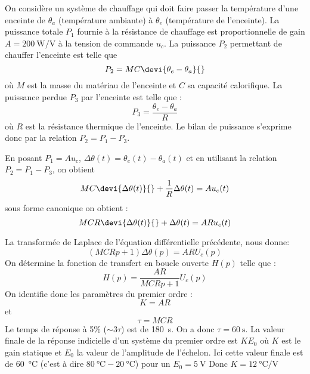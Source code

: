 On considère un système de chauffage qui doit faire passer la température 
d'une enceinte de $\theta_a$  (température ambiante) à $\theta_e$ (température 
de l'enceinte). 
La puissance totale $P_1$ fournie à la résistance de chauffage 
est proportionnelle de gain $A=\SI{200}{\watt\per\volt}$ à la tension de 
commande $u_c$. La puissance $P_2$ permettant de chauffer l'enceinte est 
telle que 
\[
    P_2=MC\devi{\theta_e-\theta_a}{}
\]
où $M$ est la masse du matériau de l'enceinte et $C$ sa capacité calorifique.
La puissance perdue $P_3$ par l'enceinte est telle que :
\[
    P_3=\dfrac{\theta_e-\theta_a}{R}
\]
où $R$ est la résistance thermique de l'enceinte.
Le bilan de puissance s'exprime donc par la relation $P_2=P_1-P_3$.

En posant $P_1=Au_c$, $\Delta\theta(t)=\theta_e(t)-\theta_a(t)$ et en utilisant
la relation $P_2=P_1-P_3$, on obtient 
\[
    MC\devi{\Delta\theta(t)}{}+\dfrac{1}{R}\Delta\theta(t)=Au_c(t)
\]
sous forme canonique on obtient :
\[
    MCR\devi{\Delta\theta(t)}{}+\Delta\theta(t)=ARu_c(t)
\]

La transformée de Laplace de l'équation différentielle précédente, nous donne:
\[
    (MCRp+1)\Delta\theta(p)=AR U_c(p)
\]
On détermine la fonction de transfert en boucle ouverte $H(p)$ telle que :
\[
    H(p)=\dfrac{AR}{MCRp+1} U_c(p)
\]
On identifie donc les paramètres du premier ordre :
\[
    K=AR
\]
et
\[
    \tau=MCR
\]
Le temps de réponse à 5\% ($\sim 3\tau$) est de \SI{180}{\second}. 
On a donc $\tau=\SI{60}{\second}$. 
La valeur finale de la réponse indicielle d'un système du premier ordre est 
$KE_0$ où $K$ est le gain statique et $E_0$ la valeur de l'amplitude de 
l'échelon. Ici cette valeur finale est de \SI{60}{\celsius} (c'est à dire 
$\SI{80}{\celsius} -\SI{20}{\celsius}$) pour un $E_0=\SI{5}{\volt}$
Donc $K=\SI{12}{\celsius\per\volt}$

